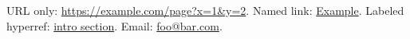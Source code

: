 \documentclass{article}
\begin{document}
URL only: \url{https://example.com/page?x=1&y=2}.
Named link: \href{https://example.org}{Example}.
Labeled hyperref: \hyperref[sec:intro]{intro section}.
Email: \href{mailto:foo@bar.com}{foo@bar.com}.
\end{document}
